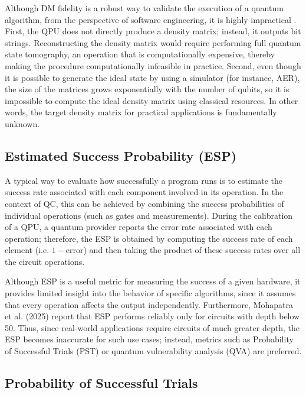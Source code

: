 \documentclass[pdflatex,sn-mathphys-num]{sn-jnl}
\theoremstyle{thmstyleone}%
\theoremstyle{thmstyletwo}%
\theoremstyle{thmstylethree}%
\begin{document}
Although DM fidelity is a robust way to validate the execution of a quantum algorithm, from the perspective of software engineering, it is highly impractical \cite{LI20146878_2014}. First, the QPU does not directly produce a density matrix; instead, it outputs bit strings. Reconstructing the density matrix would require performing full quantum state tomography, an operation that is computationally expensive, thereby making the procedure computationally infeasible in practice. Second, even though it is possible to generate the ideal state by using a simulator (for instance, AER), the size of the matrices grows exponentially with the number of qubits, so it is impossible to compute the ideal density matrix using classical resources. In other words, the target density matrix for practical applications is fundamentally unknown.

\subsection{Estimated Success Probability (ESP)}

A typical way to evaluate how successfully a program runs is to estimate the success rate associated with each component involved in its operation. In the context of QC, this can be achieved by combining the success probabilities of individual operations (such as gates and measurements). During the calibration of a QPU, a quantum provider reports the error rate associated with each operation; therefore, the ESP is obtained by computing the success rate of each element (i.e. \(1 - \text{error}\)) and then taking the product of these success rates over all the circuit operations.

Although ESP is a useful metric for measuring the success of a given hardware, it provides limited insight into the behavior of specific algorithms, since it assumes that every operation affects the output independently. Furthermore, Mohapatra et al. (2025) report that ESP performs reliably only for circuits with depth below 50. Thus, since real-world applications require circuits of much greater depth, the ESP becomes inaccurate for such use cases; instead, metrics such as Probability of Successful Trials (PST) or quantum vulnerability analysis (QVA) \cite{qiQuantumVulnerabilityAnalysis_2024} are preferred.

\subsection{Probability of Successful Trials}
\end{document}
